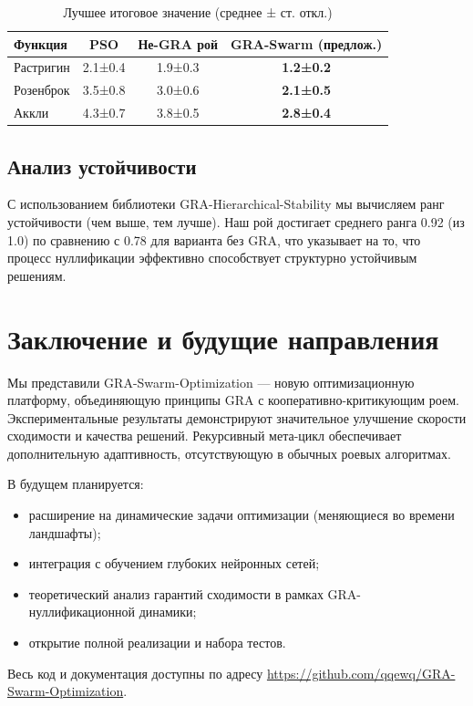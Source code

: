 \documentclass[12pt,a4paper]{article}
\begin{document}
\begin{table}[h]
\centering
\caption{Лучшее итоговое значение (среднее ± ст. откл.)}
\label{tab:fitness}
\begin{tabular}{lccc}
\toprule
Функция & PSO & Не-GRA рой & GRA-Swarm (предлож.) \\
\midrule
Растригин & 2.1±0.4 & 1.9±0.3 & \textbf{1.2±0.2} \\
Розенброк & 3.5±0.8 & 3.0±0.6 & \textbf{2.1±0.5} \\
Аккли & 4.3±0.7 & 3.8±0.5 & \textbf{2.8±0.4} \\
\bottomrule
\end{tabular}
\end{table}

\subsection{Анализ устойчивости}
С использованием библиотеки GRA-Hierarchical-Stability мы вычисляем ранг устойчивости (чем выше, тем лучше). Наш рой достигает среднего ранга 0.92 (из 1.0) по сравнению с 0.78 для варианта без GRA, что указывает на то, что процесс нуллификации эффективно способствует структурно устойчивым решениям.

\section{Заключение и будущие направления}
Мы представили GRA-Swarm-Optimization — новую оптимизационную платформу, объединяющую принципы GRA с кооперативно-критикующим роем. Экспериментальные результаты демонстрируют значительное улучшение скорости сходимости и качества решений. Рекурсивный мета-цикл обеспечивает дополнительную адаптивность, отсутствующую в обычных роевых алгоритмах.

В будущем планируется:
\begin{itemize}
    \item расширение на динамические задачи оптимизации (меняющиеся во времени ландшафты);
    \item интеграция с обучением глубоких нейронных сетей;
    \item теоретический анализ гарантий сходимости в рамках GRA-нуллификационной динамики;
    \item открытие полной реализации и набора тестов.
\end{itemize}

Весь код и документация доступны по адресу \url{https://github.com/qqewq/GRA-Swarm-Optimization}.
\end{document}

